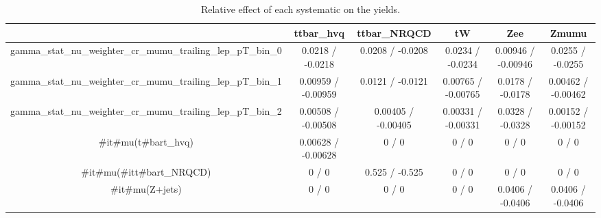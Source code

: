 \documentclass[10pt]{article}
\begin{document}
\begin{table}[htbp]
\begin{center}
\begin{tabular}{|c|c|c|c|c|c|}
\hline 
      & ttbar_hvq      & ttbar_NRQCD      & tW      & Zee      & Zmumu \\ 
\hline 
  gamma_stat_nu_weighter_cr_mumu_trailing_lep_pT_bin_0 & 0.0218 / -0.0218 & 0.0208 / -0.0208 & 0.0234 / -0.0234 & 0.00946 / -0.00946 & 0.0255 / -0.0255 \\ 
  gamma_stat_nu_weighter_cr_mumu_trailing_lep_pT_bin_1 & 0.00959 / -0.00959 & 0.0121 / -0.0121 & 0.00765 / -0.00765 & 0.0178 / -0.0178 & 0.00462 / -0.00462 \\ 
  gamma_stat_nu_weighter_cr_mumu_trailing_lep_pT_bin_2 & 0.00508 / -0.00508 & 0.00405 / -0.00405 & 0.00331 / -0.00331 & 0.0328 / -0.0328 & 0.00152 / -0.00152 \\ 
  #it{#mu}(t#bar{t}_{hvq}) & 0.00628 / -0.00628 & 0 / 0 & 0 / 0 & 0 / 0 & 0 / 0 \\ 
  #it{#mu}(#it{t#bar{t}}_{NRQCD}) & 0 / 0 & 0.525 / -0.525 & 0 / 0 & 0 / 0 & 0 / 0 \\ 
  #it{#mu}(Z+jets) & 0 / 0 & 0 / 0 & 0 / 0 & 0.0406 / -0.0406 & 0.0406 / -0.0406 \\ 
\hline 
\end{tabular} 
\caption{Relative effect of each systematic on the yields.} 
\end{center} 
\end{table} 
\end{document}
